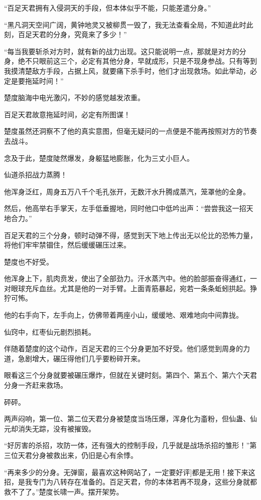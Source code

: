 
\begin{this_body}

“百足天君拥有入侵洞天的手段，但本体似乎不能，只能差遣分身。”

“黑凡洞天空间广阔，黄钟地灵又被柳贯一毁了，我无法查看全局，不知道此时此刻，百足天君的分身，究竟来了多少！”

“每当我要斩杀对方时，就有新的战力出现。这只能说明一点，那就是对方的分身，绝不只眼前这三个，必定有其他分身，早就成形，只是不现身参战。只有等到我摸清楚敌方手段，占据上风，就要痛下杀手时，他们才出现救场。如此举动，必定是要拖延时间！”

楚度脑海中电光激闪，不妙的感觉越发浓重。

百足天君故意拖延时间，必定有所图谋！

楚度虽然还洞察不了他的真实意图，但毫无疑问的一点便是不能再按照对方的节奏去战斗。

念及于此，楚度陡然爆发，身躯猛地膨胀，化为三丈小巨人。

仙道杀招战力蒸腾！

他浑身泛红，周身五万八千个毛孔张开，无数汗水升腾成蒸汽，笼罩他的全身。

然后，他高举右手掌天，左手低垂握地，同时他口中低吟出声：“尝尝我这一招天地合力。”

百足天君的三个分身，顿时动弹不得，感觉到天下地上传出无以伦比的恐怖力量，将他们牢牢禁锢住，然后缓缓碾压过来。

楚度也不好受。

他浑身上下，肌肉贲发，使出了全部劲力。汗水蒸汽中。他的脸部振奋得通红，一对眼球充斥血丝。尤其是他的一对手臂。上面青筋暴起，宛若一条条蚯蚓拱起。狰狞可怖。

他的右手向下，左手向上，仿佛带着两座小山，缓缓地、艰难地向中间靠拢。

仙窍中，红枣仙元剧烈损耗。

伴随着楚度的这个动作，百足天君的三个分身更加不好受。他们感觉到周身的力道，急剧增大，碾压得他们几乎要粉碎开来。

眼看这三个分身就要被碾压爆炸，但就在关键时刻。第四个、第五个、第六个天君分身一齐赶来救场。

砰砰。

两声闷响，第一位、第二位天君分身被楚度当场压爆，浑身化为齑粉，但仙蛊、仙元却消失无踪，没有被摧毁。

“好厉害的杀招，攻防一体，还有强大的控制手段，几乎就是战场杀招的雏形！”第三位天君分身被救出来，仍旧是心有余悸。

“再来多少的分身。无弹窗，最喜欢这种网站了，一定要好评]都是无用！接下来这招，是我专门为八转存在准备的。百足天君，你的本体若再不现身，这些分身就都救不了了。”楚度长啸一声。摆开架势。


\end{this_body}

